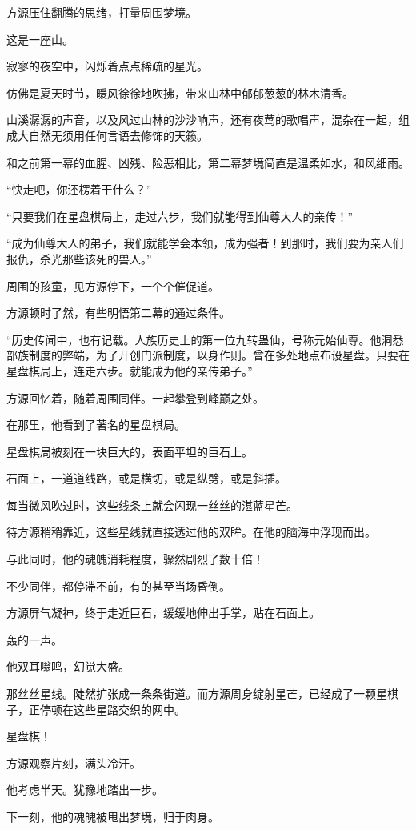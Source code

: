 \begin{this_body}
方源压住翻腾的思绪，打量周围梦境。

这是一座山。

寂寥的夜空中，闪烁着点点稀疏的星光。

仿佛是夏天时节，暖风徐徐地吹拂，带来山林中郁郁葱葱的林木清香。

山溪潺潺的声音，以及风过山林的沙沙响声，还有夜莺的歌唱声，混杂在一起，组成大自然无须用任何言语去修饰的天籁。

和之前第一幕的血腥、凶残、险恶相比，第二幕梦境简直是温柔如水，和风细雨。

“快走吧，你还楞着干什么？”

“只要我们在星盘棋局上，走过六步，我们就能得到仙尊大人的亲传！”

“成为仙尊大人的弟子，我们就能学会本领，成为强者！到那时，我们要为亲人们报仇，杀光那些该死的兽人。”

周围的孩童，见方源停下，一个个催促道。

方源顿时了然，有些明悟第二幕的通过条件。

“历史传闻中，也有记载。人族历史上的第一位九转蛊仙，号称元始仙尊。他洞悉部族制度的弊端，为了开创门派制度，以身作则。曾在多处地点布设星盘。只要在星盘棋局上，连走六步。就能成为他的亲传弟子。”

方源回忆着，随着周围同伴。一起攀登到峰巅之处。

在那里，他看到了著名的星盘棋局。

星盘棋局被刻在一块巨大的，表面平坦的巨石上。

石面上，一道道线路，或是横切，或是纵劈，或是斜插。

每当微风吹过时，这些线条上就会闪现一丝丝的湛蓝星芒。

待方源稍稍靠近，这些星线就直接透过他的双眸。在他的脑海中浮现而出。

与此同时，他的魂魄消耗程度，骤然剧烈了数十倍！

不少同伴，都停滞不前，有的甚至当场昏倒。

方源屏气凝神，终于走近巨石，缓缓地伸出手掌，贴在石面上。

轰的一声。

他双耳嗡鸣，幻觉大盛。

那丝丝星线。陡然扩张成一条条街道。而方源周身绽射星芒，已经成了一颗星棋子，正停顿在这些星路交织的网中。

星盘棋！

方源观察片刻，满头冷汗。

他考虑半天。犹豫地踏出一步。

下一刻，他的魂魄被甩出梦境，归于肉身。


\end{this_body}

